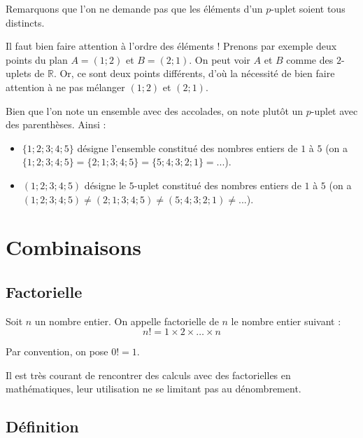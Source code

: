	Remarquons que l'on ne demande pas que les éléments d'un $p$-uplet soient tous distincts.
	
	\begin{tip}
		Il faut bien faire attention à l'ordre des éléments ! Prenons par exemple deux points du plan $A = (1; 2)$ et $B = (2; 1)$.
		\newpar
		On peut voir $A$ et $B$ comme des $2$-uplets de $\mathbb{R}$. Or, ce sont deux points différents, d'où la nécessité de bien faire attention à ne pas mélanger $(1; 2)$ et $(2; 1)$.
	\end{tip}
	
	\begin{tip}[Notation]
		Bien que l'on note un ensemble avec des accolades, on note plutôt un $p$-uplet avec des parenthèses. Ainsi :
		\begin{itemize}
			\item $\{1; 2; 3; 4; 5\}$ désigne l'ensemble constitué des nombres entiers de $1$ à $5$ (on a $\{1; 2; 3; 4; 5\} = \{2; 1; 3; 4; 5\} = \{5; 4; 3; 2; 1\} = ...$).
			\item $(1; 2; 3; 4; 5)$ désigne le $5$-uplet constitué des nombres entiers de $1$ à $5$ (on a $(1; 2; 3; 4; 5) \neq (2; 1; 3; 4; 5) \neq (5; 4; 3; 2; 1) \neq ...$).
		\end{itemize}
	\end{tip}
	
	\section{Combinaisons}
	
	\subsection{Factorielle}
	
	\begin{formula}[Définition]
		Soit $n$ un nombre entier. On appelle factorielle de $n$ le nombre entier suivant :
		\[ n! = 1 \times 2 \times \dots \times n \]
	\end{formula}
	
	\begin{tip}[Convention]
		Par convention, on pose $0! = 1$.
	\end{tip}
	
	Il est très courant de rencontrer des calculs avec des factorielles en mathématiques, leur utilisation ne se limitant pas au dénombrement.
	
	\subsection{Définition}
	
